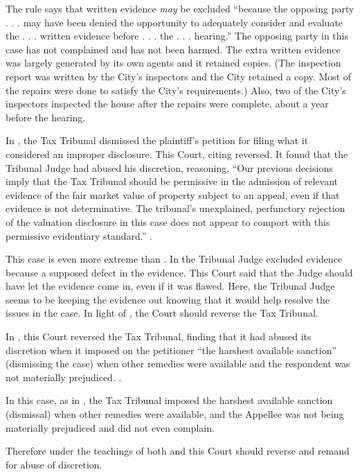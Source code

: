 \documentclass[12pt,\documentclassflag]{michiganCourtOfAppealsBrief}
\begin{document}
The rule says that written evidence \emph{may} be excluded ``because the opposing party . . . may have been denied the opportunity to adequately consider and evaluate the . . . written evidence before . . . the . . .  hearing.'' The opposing party in this case has not complained and has not been harmed. The extra written evidence was largely generated by its own agents and it retained copies. (The inspection report was written by the City's inspectors and the City retained a copy. Most of the repairs were done to satisfy the City's requirements.) Also, two of the City's inspectors inspected the house after the repairs were complete, about a year before the hearing.

In \cite[s]{Professional Plaza}, the Tax Tribunal dismissed the plaintiff's petition for filing what it considered an improper disclosure. This Court, citing  reversed. It found that the Tribunal Judge had abused his discretion, reasoning, ``Our previous decisions imply that the Tax Tribunal should be permissive in the admission of relevant evidence of the fair market value of property subject to an appeal, even if that evidence is not determinative. The tribunal's unexplained, perfunctory rejection of the valuation disclosure in this case does not appear to comport with this permissive evidentiary standard.'' .

This case is even more extreme than \cite[s]{Professional Plaza}. In \cite[s]{Professional Plaza} the Tribunal Judge excluded evidence because a supposed defect in the evidence. This Court said that the Judge should have let the evidence come in, even if it was flawed. Here, the Tribunal Judge seems to be keeping the evidence out knowing that it would help resolve the issues in the case. In light of \cite[s]{Professional Plaza}, the Court should reverse the Tax Tribunal.

In \cite{Stevens}, this Court reversed the Tax Tribunal, finding that it had abused its discretion when it imposed on the petitioner ``the harshest available sanction'' (dismissing the case) when other remedies were available and the respondent was not materially prejudiced. .

In this case, as in \cite[s]{Stevens}, the Tax Tribunal imposed the harshest available sanction (dismissal) when other remedies were available, and the Appellee was not being materially prejudiced and did not even complain. 

Therefore under the teachings of both \cite[s] {Professional Plaza}
and \cite[s]{Stevens} this Court should reverse and remand for abuse of discretion.
\end{document}
